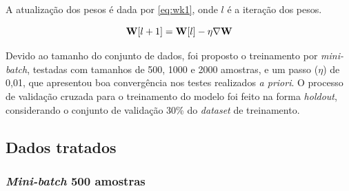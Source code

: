 A atualização dos pesos é dada por \eqref{eq:wk1}, onde $l$ é a iteração dos pesos.

\begin{equation}\label{eq:wk1}
	\mathbf{W}[l+1] = \mathbf{W}[l] - \eta\nabla\mathbf{W}
\end{equation}

Devido ao tamanho do conjunto de dados, foi proposto o treinamento por \textit{mini-batch}, testadas com tamanhos de 500, 1000 e 2000 amostras, e um passo ($\eta$) de 0,01, que apresentou boa convergência nos testes realizados \textit{a priori}. O processo de validação cruzada para o treinamento do modelo foi feito na forma \textit{holdout}, considerando o conjunto de validação 30\% do \textit{dataset} de treinamento.



\subsection{Dados tratados}

\subsubsection*{\textit{Mini-batch} 500 amostras}

